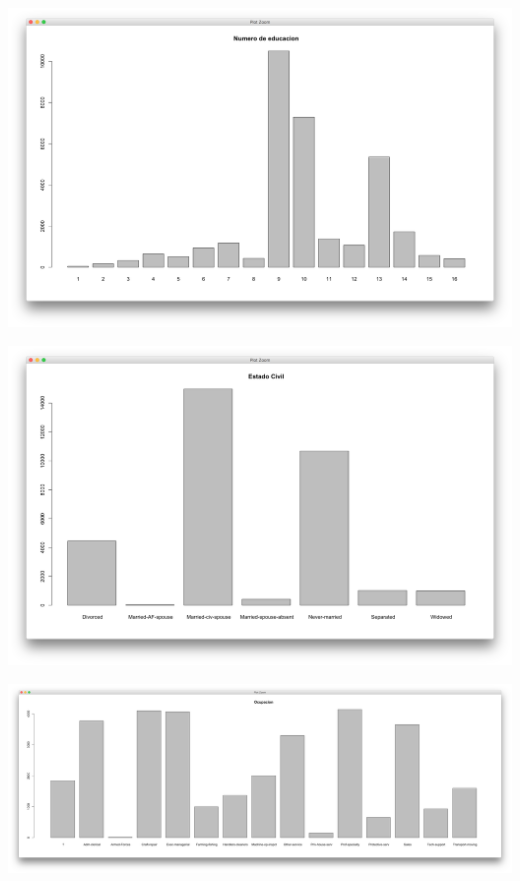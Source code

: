 \documentclass{article}
\begin{document}
 \begin{center}
   \hbox{\hspace{-5.8em}\includegraphics[scale=0.4]{graficas/numeroDeEducacion}}
 \end{center}
 \begin{center}
   \hbox{\hspace{-5.8em}\includegraphics[scale=0.4]{graficas/EstadoCivil}}
 \end{center}
 \begin{center}
   \hbox{\hspace{-5.8em}\includegraphics[scale=0.23]{graficas/ocupacion}}
 \end{center}
\end{document}
